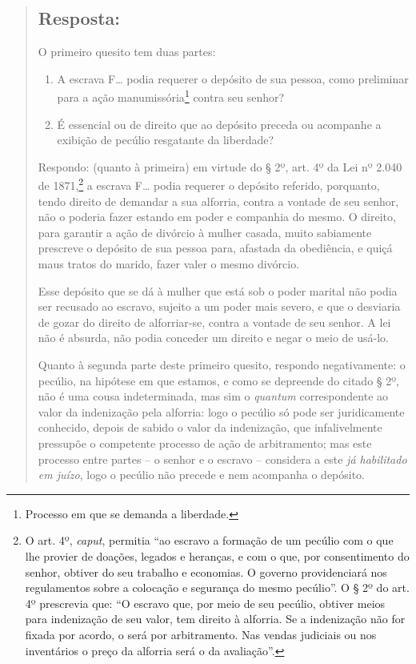 \begin{quote}
\subsection{Resposta:}

O primeiro quesito tem duas partes:

\begin{enumerate}[label=\arabic*º]
\item A escrava F\ldots{} podia requerer o depósito de sua pessoa, como
preliminar para a ação manumissória\footnote{ Processo em que se
  demanda a liberdade.} contra seu senhor?

\item É essencial ou de direito que ao depósito preceda ou acompanhe a
exibição de pecúlio resgatante da liberdade?
\end{enumerate}

Respondo: (quanto à primeira) em virtude do § 2º, art. 4º da Lei nº
2.040 de 1871,\footnote{ O art. 4º, \emph{caput}, permitia ``ao escravo
  a formação de um pecúlio com o que lhe provier de doações, legados e
  heranças, e com o que, por consentimento do senhor, obtiver do seu
  trabalho e economias. O governo providenciará nos regulamentos sobre a
  colocação e segurança do mesmo pecúlio''. O § 2º do art. 4º prescrevia
  que: ``O escravo que, por meio de seu pecúlio, obtiver meios para
  indenização de seu valor, tem direito à alforria. Se a indenização não
  for fixada por acordo, o será por arbitramento. Nas vendas judiciais
  ou nos inventários o preço da alforria será o da avaliação''.} a
escrava F\ldots{} podia requerer o depósito referido, porquanto, tendo
direito de demandar a sua alforria, contra a vontade de seu senhor, não
o poderia fazer estando em poder e companhia do mesmo. O direito, para
garantir a ação de divórcio à mulher casada, muito sabiamente prescreve
o depósito de sua pessoa para, afastada da obediência, e quiçá maus
tratos do marido, fazer valer o mesmo divórcio.

Esse depósito que se dá à mulher que está sob o poder marital não podia
ser recusado ao escravo, sujeito a um poder mais severo, e que o
desviaria de gozar do direito de alforriar-se, contra a vontade de seu
senhor. A lei não é absurda, não podia conceder um direito e negar o
meio de usá-lo.

Quanto à segunda parte deste primeiro quesito, respondo negativamente: o
pecúlio, na hipótese em que estamos, e como se depreende do citado § 2º,
não é uma cousa indeterminada, mas sim o \emph{quantum} correspondente
ao valor da indenização pela alforria: logo o pecúlio só pode ser
juridicamente conhecido, depois de sabido o valor da indenização, que
infalivelmente pressupõe o competente processo de ação de arbitramento;
mas este processo entre partes -- o senhor e o escravo -- considera a
este \emph{já habilitado em juízo}, logo o pecúlio não precede e nem
acompanha o depósito.


\end{quote}
